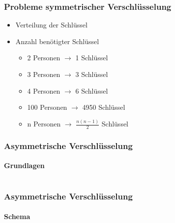 \begin{frame}
  \frametitle{Probleme symmetrischer Verschlüsselung}
  \begin{itemize}
    \item Verteilung der Schlüssel
    \item Anzahl benötigter Schlüssel
    \pause
    \begin{itemize}
      \item 2 Personen $\rightarrow$ 1 Schlüssel
      \item 3 Personen $\rightarrow$ 3 Schlüssel
      \item 4 Personen $\rightarrow$ 6 Schlüssel
      \item 100 Personen $\rightarrow$ 4950 Schlüssel
      \item n Personen $\rightarrow$ $\frac{n(n-1)}{2}$ Schlüssel
    \end{itemize}
  \end{itemize}
\end{frame}

\begin{frame}
  \frametitle{Asymmetrische Verschlüsselung}
  \framesubtitle{Grundlagen}
  \begin{columns}[c]
    \begin{column}{0.5\textwidth}
      \center {}
    \end{column}
    \begin{column}{0.5\textwidth}
      \center {}
    \end{column}
  \end{columns}
\end{frame}

\begin{frame}
  \frametitle{Asymmetrische Verschlüsselung}
  \framesubtitle{Schema}
  \center {}
\end{frame}